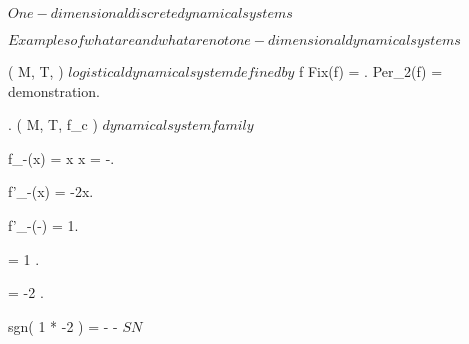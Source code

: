 \documentclass[../Main/main]{subfiles}
\begin{document}
\unit{ $ One-dimensional discrete dynamical systems $ }
{
	\introduction
	{ 
		$Examples of what are and what are not one-dimensional dynamical systems$ 
	}

	{
		{
			( M, T, \phi ) $ logistical dynamical system defined by $ f
		}
		\holds
		{
			Fix(f) = .
			Per_2(f) = 
		}
		\demonstration
		{
			demonstration.
		}
	}


	{
		{
			.
			( M, T, f_c ) $ dynamical system family $
		}
		{
			f_{-}(x) = x \ifandonlyif x = -.

			f'_{-}(x) = -2x.

			f'_{-}(-) = 1.

			 = 1 .

			 = -2 .

			sgn( 1 * -2 ) = - \imp - $ SN $
		}
	}

}
\end{document}
